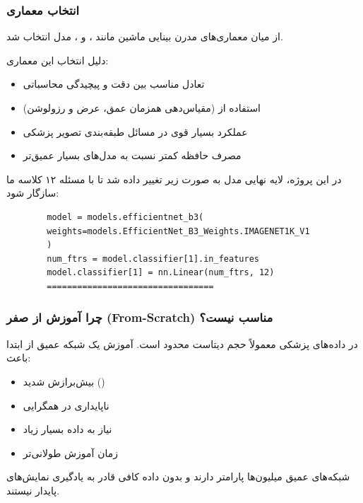 \documentclass{article}
\begin{document}
\subsubsection{انتخاب معماری}

از میان معماری‌های مدرن بینایی ماشین مانند ،  و ،
مدل  انتخاب شد.

دلیل انتخاب این معماری:

\begin{itemize}
	\item تعادل مناسب بین دقت و پیچیدگی محاسباتی
	\item استفاده از  (مقیاس‌دهی همزمان عمق، عرض و رزولوشن)
	\item عملکرد بسیار قوی در مسائل طبقه‌بندی تصویر پزشکی
	\item مصرف حافظه کمتر نسبت به مدل‌های بسیار عمیق‌تر
\end{itemize}

در این پروژه، لایه نهایی مدل به صورت زیر تغییر داده شد تا با مسئله ۱۲ کلاسه ما سازگار شود:


\begin{LTR}
	\begin{verbatim}
		model = models.efficientnet_b3(
		weights=models.EfficientNet_B3_Weights.IMAGENET1K_V1
		)
		num_ftrs = model.classifier[1].in_features
		model.classifier[1] = nn.Linear(num_ftrs, 12)
		=================================
	\end{verbatim}
\end{LTR}

\subsubsection{چرا آموزش از صفر (From-Scratch) مناسب نیست؟}

در داده‌های پزشکی معمولاً حجم دیتاست محدود است. آموزش یک شبکه عمیق از ابتدا باعث:

\begin{itemize}
	\item بیش‌برازش شدید ()
	\item ناپایداری در همگرایی
	\item نیاز به داده بسیار زیاد
	\item زمان آموزش طولانی‌تر
\end{itemize}

شبکه‌های عمیق میلیون‌ها پارامتر دارند و بدون داده کافی قادر به یادگیری نمایش‌های پایدار نیستند.
\end{document}
